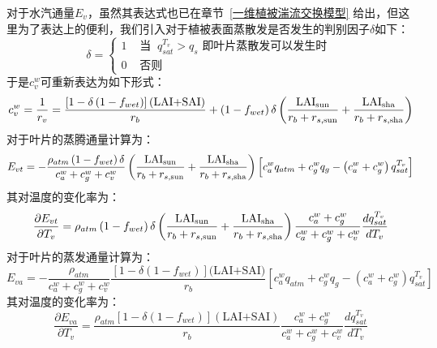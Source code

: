 对于水汽通量$E_{v}$，虽然其表达式也已在章节~\ref{一维植被湍流交换模型} 给出，但这里为了表达上的便利，我们引入对于植被表面蒸散发是否发生的判别因子$\delta$如下：
\begin{equation}
\delta=
\begin{cases}
 1 & \text { 当 }\ q_{s a t}^{T_{v}}>q_{s} \text { 即叶片蒸散发可以发生时 } \\ 
 0 & \text { 否则 }
 \end{cases}
\end{equation}
于是$c_v^w$可重新表达为如下形式：
\begin{equation}
c_{v}^{w}=\frac{1}{r_{v}}=\frac{\left[1-\delta\left(1-f_{wet}\right)\right](\text{LAI+SAI})}{r_{b}}+\left( 1 - f_{wet} \right)\delta\left( \frac{\rm LAI_{sun}}{r_{b} + r_{s,\rm sun}} + \frac{\rm LAI_{sha}}{r_{b} + r_{s,\rm sha}} \right)
\end{equation}
对于叶片的蒸腾通量计算为：
\begin{equation}
E_{vt} = -\frac{\rho_{atm}\left(1-f_{w e t}\right)\delta }{c_{a}^{w}+c_{g}^{w}+c_{v}^{w}}\left( \frac{\rm LAI_{sun}}{r_{b} + r_{s,\rm sun}} + \frac{\rm LAI_{sha}}{r_{b} + r_{s,\rm sha}} \right) \left[c_{a}^{w} q_{atm}+c_{g}^{w} q_{g}-\left(c_{a}^{w}+c_{g}^{w}\right) q_{s a t}^{T_{v}}\right] 
\end{equation}
其对温度的变化率为：
\begin{equation}
\frac{\partial E_{vt}}{\partial T_{v}} = \rho_{atm} \left(1-f_{w e t}\right) \delta \left( \frac{\rm LAI_{sun}}{r_{b} + r_{s, \rm sun}} + \frac{\rm LAI_{sha}}{r_{b} + r_{s,\rm sha}} \right)\frac{c_{a}^{w}+c_{g}^{w}}{c_{a}^{w}+c_{g}^{w}+c_{v}^{w}} \frac{d q_{s a t}^{T_{v}}}{d T_{v}}
\end{equation}
对于叶片的蒸发通量计算为：
\begin{equation}
E_{va} = -\frac{\rho_{atm}}{c_{a}^{w}+c_{g}^{w}+c_{v}^{w}} \frac{\left[1-\delta\left(1-f_{w e t}\right)\right](\text {LAI+SAI)}}{r_{b}}\left[c_{a}^{w} q_{atm}+c_{g}^{w} q_{g}-\left(c_{a}^{w}+c_{g}^{w}\right) q_{sat}^{T_{v}}\right]
\end{equation}
其对温度的变化率为：
\begin{equation}
\frac{\partial E_{va}}{\partial T_{v}} = \frac{\rho_{atm}\left[1-\delta\left(1-f_{w e t}\right)\right](\text {LAI+SAI})}{r_{b}} \frac{c_{a}^{w}+c_{g}^{w}}{c_{a}^{w}+c_{g}^{w}+c_{v}^{w}} \frac{d q_{s a t}^{T_{v}}}{d T_{v}}
\end{equation}

